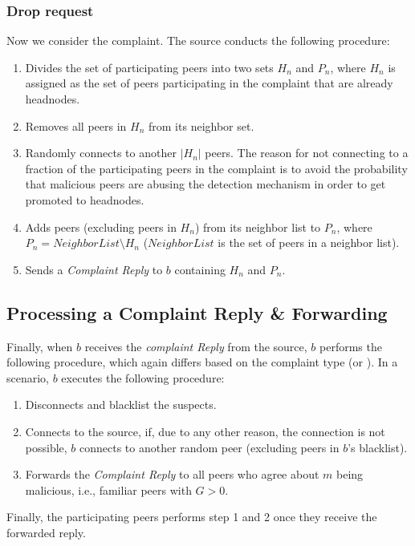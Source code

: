 \subsubsection*{Drop request}
Now we consider the \drop complaint. The source conducts the following procedure:
\begin{enumerate}
 \item Divides the set of participating peers into two sets $H_n$ and $P_n$, where $H_n$ is assigned as the set of peers participating in the complaint that are already headnodes. 
 \item Removes all peers in $H_n$ from its neighbor set.
 \item Randomly connects to another $|H_n|$ peers. 
 The reason for not connecting to a fraction of the participating peers in the complaint is to avoid the probability that malicious peers are abusing the detection mechanism in order to get promoted to headnodes.
 \item Adds peers (excluding peers in $H_n$) from its neighbor list to $P_n$, where $P_n = NeighborList\setminus H_n$ ($NeighborList$ is the set of peers in a neighbor list). 
 \item Sends a \textit{Complaint Reply} to $b$ containing $H_n$ and $P_n$.
\end{enumerate}

\subsection{Processing a Complaint Reply \& Forwarding}

Finally, when $b$ receives the \textit{complaint Reply} from the source, $b$ performs the following procedure,
which again differs based on the complaint type (\drop or \manp).
In a \manp scenario, $b$ executes the following procedure:
\begin{enumerate}
 \item Disconnects and blacklist the suspects.
 \item Connects to the source, if, due to any other reason, the connection is not possible, $b$ connects to another random peer (excluding peers in $b$'s blacklist).
 \item Forwards the \textit{Complaint Reply} to all peers who agree about $m$ being malicious, i.e., familiar peers with $G > 0$. 
\end{enumerate}
Finally, the participating peers performs step 1 and 2 once they receive the forwarded reply.

